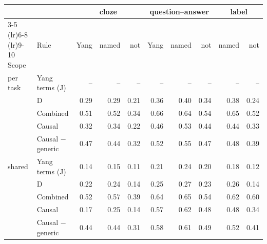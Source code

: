 \begin{tabular}{@{}llrrrrrrrr@{}}
\toprule
& & \multicolumn{3}{c}{cloze} & \multicolumn{3}{c}{question--answer} & \multicolumn{2}{c}{label} \\
\cmidrule(lr){3-5} \cmidrule(lr){6-8} \cmidrule(lr){9-10}
Scope & Rule & Yang & named & not & Yang & named & not & named & not \\
\midrule
per task & Yang terms (J) & -- & -- & -- & -- & -- & -- & -- & -- \\
 & D & 0.29 & 0.29 & 0.21 & 0.36 & 0.40 & 0.34 & 0.38 & 0.24 \\
 & Combined & 0.51 & 0.52 & 0.34 & 0.66 & 0.64 & 0.54 & 0.65 & 0.52 \\
 & Causal & 0.32 & 0.34 & 0.22 & 0.46 & 0.53 & 0.44 & 0.44 & 0.33 \\
 & Causal $-$ generic & 0.47 & 0.44 & 0.32 & 0.52 & 0.55 & 0.47 & 0.48 & 0.39 \\
\midrule
shared & Yang terms (J) & 0.14 & 0.15 & 0.11 & 0.21 & 0.24 & 0.20 & 0.18 & 0.12 \\
 & D & 0.22 & 0.24 & 0.14 & 0.25 & 0.27 & 0.23 & 0.26 & 0.14 \\
 & Combined & 0.52 & 0.57 & 0.39 & 0.64 & 0.65 & 0.54 & 0.62 & 0.60 \\
 & Causal & 0.17 & 0.25 & 0.14 & 0.57 & 0.62 & 0.48 & 0.48 & 0.34 \\
 & Causal $-$ generic & 0.44 & 0.44 & 0.31 & 0.58 & 0.61 & 0.49 & 0.52 & 0.41 \\
\bottomrule
\end{tabular}
